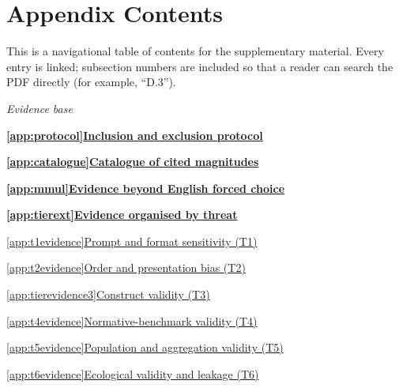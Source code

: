 \documentclass[11pt]{article}
\begin{document}


\clearpage
\appendix

\section*{Appendix Contents}

This is a navigational table of contents for the supplementary material. Every
entry is linked; subsection numbers are included so that a reader can search
the PDF directly (for example, ``D.3'').

\newcommand{\appcontentssection}[2]{%
  \noindent\hyperref[#1]{\textbf{\ref*{#1}\enspace #2}}\dotfill
  \hyperref[#1]{\pageref*{#1}}\par}
\newcommand{\appcontentssubsection}[2]{%
  \noindent\hspace*{2em}\hyperref[#1]{\ref*{#1}\enspace #2}\dotfill
  \hyperref[#1]{\pageref*{#1}}\par}
\newcommand{\appcontentsgroup}[1]{%
  \noindent\hspace*{1em}\textit{#1}\par}

\begingroup\small
\noindent\textit{Evidence base}\par\vspace{1pt}
\appcontentssection{app:protocol}{Inclusion and exclusion protocol}
\appcontentssection{app:catalogue}{Catalogue of cited magnitudes}
\appcontentssection{app:mmul}{Evidence beyond English forced choice}
\appcontentssection{app:tierext}{Evidence organised by threat}
\appcontentssubsection{app:t1evidence}{Prompt and format sensitivity (T1)}
\appcontentssubsection{app:t2evidence}{Order and presentation bias (T2)}
\appcontentssubsection{app:tierevidence3}{Construct validity (T3)}
\appcontentssubsection{app:t4evidence}{Normative-benchmark validity (T4)}
\appcontentssubsection{app:t5evidence}{Population and aggregation validity (T5)}
\appcontentssubsection{app:t6evidence}{Ecological validity and leakage (T6)}
\end{document}
